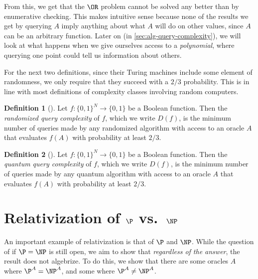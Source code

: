 \documentclass[english,12pt]{reedthesis}
\theoremstyle{plain}
\theoremstyle{definition}
\newtheorem{defn}[defn]{Definition}
\theoremstyle{remark}
\begin{document}
From this, we get that the $\OR$ problem cannot be solved any better than by
enumerative checking. This makes intuitive sense because none of the results we
get by querying $A$ imply anything about what $A$ will do on other values, since
$A$ can be an arbitrary function. Later on (in \cref{sec:alg-query-complexity}),
we will look at what happens when we give ourselves access to a
\emph{polynomial}, where querying one point could tell us information about
others.

For the next two definitions, since their Turing machines include some element
of randomness, we only require that they succeed with a $2/3$ probability. This
is in line with most definitions of complexity classes involving random
computers.

\begin{defn}[{\cite[17]{AW09}}]\label{def:rand-qc}
  Let $f\colon \{0, 1\}^{N} \rightarrow \{0, 1\}$ be a Boolean function. Then the
  \emph{randomized query complexity} of $f$, which we write $D(f)$, is the
  minimum number of queries made by any randomized algorithm with access to an
  oracle $A$ that evaluates $f(A)$ with probability at least $2/3$.
\end{defn}


\begin{defn}[{\cite[17]{AW09}}]\label{def:quant-qc}
  Let $f\colon \{0, 1\}^{N} \rightarrow \{0, 1\}$ be a Boolean function. Then the
  \emph{quantum query complexity} of $f$, which we write $D(f)$, is the minimum
  number of queries made by any quantum algorithm with access to an oracle $A$
  that evaluates $f(A)$ with probability at least $2/3$.
\end{defn}

\section{Relativization of $\P$ vs.\ $\NP$}\label{sec:rel-p-np}

An important example of relativization is that of $\P$ and $\NP$. While the
question of if $\P = \NP$ is still open, we aim to show that \emph{regardless of
the answer}, the result does not algebrize. To do this, we show that there are
some oracles $A$ where $\P^{A} = \NP^{A}$, and some where $\P^{A} \ne \NP^{A}$.
\end{document}
